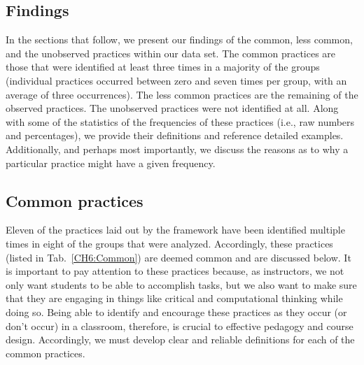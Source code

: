 \documentclass{msuphddissertation}
\begin{document}
\begin{doublespace}
\section{Findings}

In the sections that follow, we present our findings of the common, less common, and the unobserved practices within our data set.  The common practices are those that were identified at least three times in a majority of the groups (individual practices occurred between zero and seven times per group, with an average of three occurrences).  The less common practices are the remaining of the observed practices.  The unobserved practices were not identified at all.  Along with some of the statistics of the frequencies of these practices (i.e., raw numbers and percentages), we provide their definitions and reference detailed examples.  Additionally, and perhaps most importantly, we discuss the reasons as to why a particular practice might have a given frequency.

%
%
%
%
%
%
%
%
%
%
%
%
%
%
%
%

\subsection{Common practices}

Eleven of the practices laid out by the framework have been identified multiple times in eight of the groups that were analyzed.  Accordingly, these practices (listed in Tab.~\ref{CH6:Common}) are deemed common and are discussed below.  It is important to pay attention to these practices because, as instructors, we not only want students to be able to accomplish tasks, but we also want to make sure that they are engaging in things like critical and computational thinking while doing so.  Being able to identify and encourage these practices as they occur (or don't occur) in a classroom, therefore, is crucial to effective pedagogy and course design.  Accordingly, we must develop clear and reliable definitions for each of the common practices.


\end{doublespace}
\end{document}
